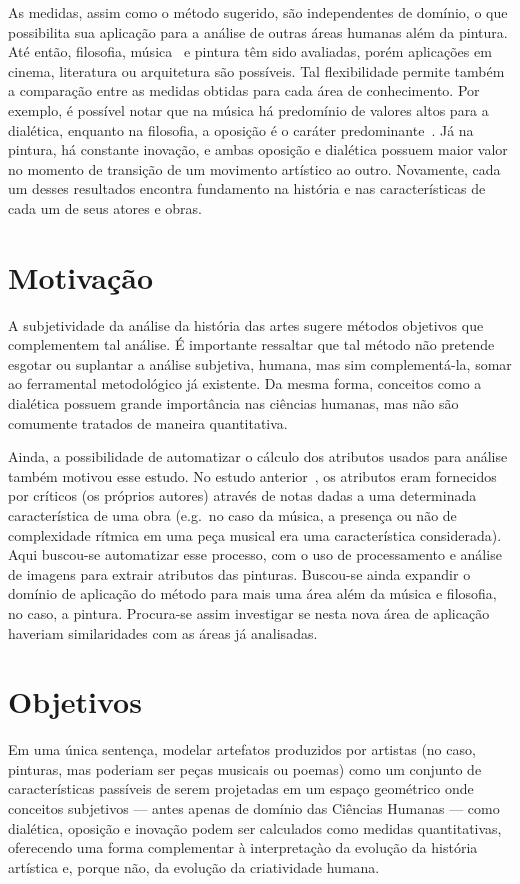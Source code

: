 As medidas, assim como o método sugerido, são independentes de
domínio, o que possibilita sua aplicação para a análise de outras
áreas humanas além da pintura. Até então, filosofia,
música~\cite{vieira} e pintura têm sido avaliadas, porém aplicações em
cinema, literatura ou arquitetura são possíveis. Tal flexibilidade
permite também a comparação entre as medidas obtidas para cada área de
conhecimento. Por exemplo, é possível notar que na música há
predomínio de valores altos para a dialética, enquanto na filosofia, a
oposição é o caráter predominante~\cite{vieira}. Já na pintura, há
constante inovação, e ambas oposição e dialética possuem maior valor
no momento de transição de um movimento artístico ao outro. Novamente,
cada um desses resultados encontra fundamento na história e nas
características de cada um de seus atores e obras.

\section{Motivação}

A subjetividade da análise da história das artes sugere métodos objetivos que
complementem tal análise. É importante ressaltar que tal método não
pretende esgotar ou suplantar a análise subjetiva, humana, mas sim
complementá-la, somar ao ferramental metodológico já existente. Da mesma forma,
conceitos como a dialética possuem grande importância nas ciências humanas, mas
não são comumente tratados de maneira quantitativa.

Ainda, a possibilidade de automatizar o cálculo dos atributos usados para
análise também motivou esse estudo. No estudo anterior~\cite{vieira}, os
atributos eram fornecidos por críticos (os próprios autores) através de notas
dadas a uma determinada característica de uma obra (e.g.\ no caso da música, a
presença ou não de complexidade rítmica em uma peça musical era uma
característica considerada). Aqui buscou-se automatizar esse processo, com o uso
de processamento e análise de imagens para extrair atributos das
pinturas. Buscou-se ainda expandir o domínio de aplicação do método para mais
uma área além da música e filosofia, no caso, a pintura. Procura-se assim
investigar se nesta nova área de aplicação haveriam similaridades com as áreas
já analisadas.

\section{Objetivos}

Em uma única sentença, modelar artefatos produzidos por artistas (no caso,
pinturas, mas poderiam ser peças musicais ou poemas) como um conjunto de
características passíveis de serem projetadas em um espaço geométrico onde
conceitos subjetivos --- antes apenas de domínio das Ciências Humanas ---
como dialética, oposição e inovação podem ser calculados como medidas
quantitativas, oferecendo uma forma complementar à interpretaçào da evolução da
história artística e, porque não, da evolução da criatividade humana.

